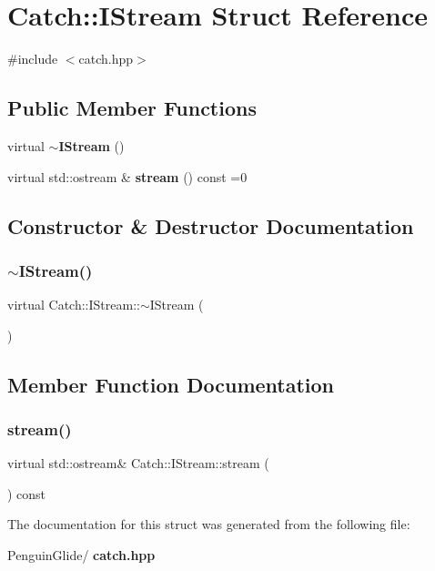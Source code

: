 \section{Catch\+::I\+Stream Struct Reference}
\label{struct_catch_1_1_i_stream}


{\ttfamily \#include $<$catch.\+hpp$>$}

\subsection*{Public Member Functions}
\begin{DoxyCompactItemize}
\item 
virtual \textbf{ $\sim$\+I\+Stream} ()
\item 
virtual std\+::ostream \& \textbf{ stream} () const =0
\end{DoxyCompactItemize}


\subsection{Constructor \& Destructor Documentation}
\mbox{\label{struct_catch_1_1_i_stream_a344a88d0e5fc1f727f5801c72b4a4e2a}} 
\subsubsection{$\sim$IStream()}
{\footnotesize\ttfamily virtual Catch\+::\+I\+Stream\+::$\sim$\+I\+Stream (\begin{DoxyParamCaption}{ }\end{DoxyParamCaption})\hspace{0.3cm}{\ttfamily [virtual]}}



\subsection{Member Function Documentation}
\mbox{\label{struct_catch_1_1_i_stream_a55a9ddbe250261ff38642f480ebdd902}} 
\subsubsection{stream()}
{\footnotesize\ttfamily virtual std\+::ostream\& Catch\+::\+I\+Stream\+::stream (\begin{DoxyParamCaption}{ }\end{DoxyParamCaption}) const\hspace{0.3cm}{\ttfamily [pure virtual]}}



The documentation for this struct was generated from the following file\+:\begin{DoxyCompactItemize}
\item 
Penguin\+Glide/\textbf{ catch.\+hpp}\end{DoxyCompactItemize}
